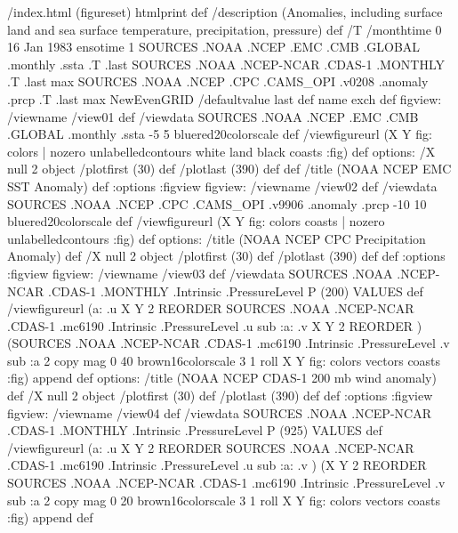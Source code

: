 \begin{ingrid}
/index.html {(figureset) htmlprint} def
/description (Anomalies, including surface land and sea surface temperature, precipitation, pressure) def
/T 
/monthtime
0
16 Jan 1983 ensotime
1
SOURCES .NOAA .NCEP .EMC .CMB .GLOBAL .monthly .ssta .T .last
SOURCES .NOAA .NCEP-NCAR .CDAS-1 .MONTHLY .T .last
max
SOURCES .NOAA .NCEP .CPC .CAMS_OPI .v0208 .anomaly .prcp .T .last
max
NewEvenGRID
/defaultvalue last def
name exch def
figview:
/viewname /view01 def
/viewdata SOURCES .NOAA .NCEP .EMC .CMB .GLOBAL .monthly .ssta 
-5 5 bluered20colorscale
def
/viewfigureurl (X Y fig: colors | nozero unlabelledcontours white land black coasts :fig) def
options:
/X null 2 object
/plotfirst (30) def
/plotlast (390) def
def
/title (NOAA NCEP EMC SST Anomaly) def
:options
:figview
figview:
/viewname /view02 def
/viewdata 
SOURCES .NOAA .NCEP .CPC .CAMS_OPI .v9906 .anomaly .prcp
-10 10 bluered20colorscale
  def
/viewfigureurl (X Y fig: colors coasts | nozero unlabelledcontours :fig) def
options:
/title (NOAA NCEP CPC Precipitation Anomaly) def
/X null 2 object
/plotfirst (30) def
/plotlast (390) def
def
:options
:figview
figview:
/viewname /view03 def
/viewdata  SOURCES .NOAA .NCEP-NCAR .CDAS-1 .MONTHLY .Intrinsic .PressureLevel
  P (200) VALUES
  def
/viewfigureurl (a: .u X Y 2 REORDER SOURCES .NOAA .NCEP-NCAR .CDAS-1 .mc6190 .Intrinsic .PressureLevel .u sub :a: .v X Y 2 REORDER )
(SOURCES .NOAA .NCEP-NCAR .CDAS-1 .mc6190 .Intrinsic .PressureLevel .v sub :a 2 copy  mag 0 40 brown16colorscale 3 1 roll X Y fig: colors vectors coasts :fig) append def
options:
/title (NOAA NCEP CDAS-1 200 mb wind anomaly) def
/X null 2 object
/plotfirst (30) def
/plotlast (390) def
def
:options
:figview
figview:
/viewname /view04 def
/viewdata  SOURCES .NOAA .NCEP-NCAR .CDAS-1 .MONTHLY .Intrinsic .PressureLevel
  P (925) VALUES
  def
/viewfigureurl (a: .u X Y 2 REORDER SOURCES .NOAA .NCEP-NCAR .CDAS-1 .mc6190 .Intrinsic .PressureLevel .u sub :a: .v )
(X Y 2 REORDER SOURCES .NOAA .NCEP-NCAR .CDAS-1 .mc6190 .Intrinsic .PressureLevel .v sub :a 2 copy  mag 0 20 brown16colorscale 3 1 roll X Y fig: colors vectors coasts :fig) append def

\end{ingrid}

